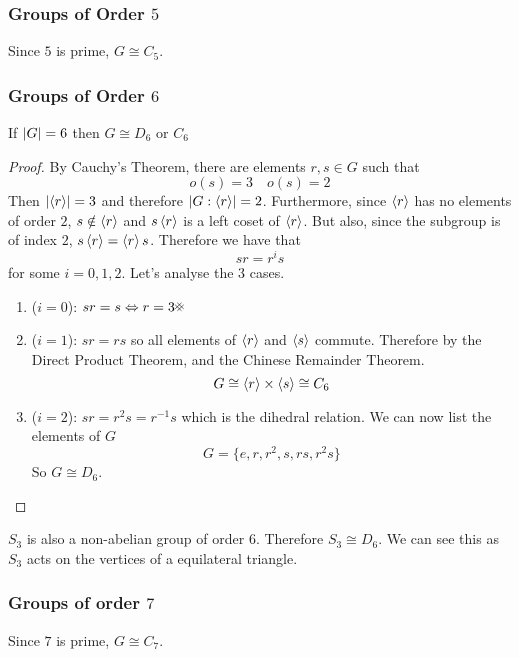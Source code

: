 \documentclass{article}
\begin{document}
\subsubsection*{Groups of Order $5$}
Since $5$ is prime, $G \cong C_5$.
\subsubsection*{Groups of Order $6$}
\begin{lemma}
    If $\left\lvert G\right\rvert = 6$ then $G \cong D_6 \text{ or } C_6$
\end{lemma}
\begin{proof}
    By Cauchy's Theorem, there are elements $r, s \in G$ such that
    \[
        o(s) = 3 \quad o(s) = 2
    \]
    Then $\left\lvert \left\langle r\right\rangle\right\rvert = 3$ and therefore $\left\lvert G : \left\langle r\right\rangle\right\rvert = 2$.
    Furthermore, since $\left\langle r\right\rangle$ has no elements of order $2$, $s \notin \left\langle r\right\rangle$ and $s \left\langle r\right\rangle$ is a left coset of $\left\langle r\right\rangle$.
    But also, since the subgroup is of index $2$, $s\left\langle r\right\rangle = \left\langle r\right\rangle s$. Therefore we have that
    \[
        sr = r^is  
    \]
    for some $i = 0, 1, 2$. Let's analyse the 3 cases.
    \begin{enumerate}[cases]
        \item ($i = 0$): $sr = s \Leftrightarrow r = 3 \contradiction$
        \item ($i = 1$): $sr = rs$ so all elements of $\left\langle r\right\rangle$ and $\left\langle s\right\rangle$ commute.
        Therefore by the Direct Product Theorem, and the Chinese Remainder Theorem.
        \[
            G \cong \left\langle r\right\rangle \times \left\langle s\right\rangle \cong C_6  
        \]
        \item ($i = 2$): $sr = r^2s = r^{-1}s$ which is the dihedral relation. We can now list the elements of $G$
        \[
            G = \{e, r, r^2, s, rs, r^2s \}
        \]
        So $G \cong D_6$.
    \end{enumerate}
\end{proof}
\begin{remark}
    $S_3$ is also a non-abelian group of order $6$. Therefore $S_3 \cong D_6$.
    We can see this as $S_3$ acts on the vertices of a equilateral triangle.
\end{remark}

\subsubsection*{Groups of order $7$}
Since $7$ is prime, $G \cong C_7$.
\end{document}
